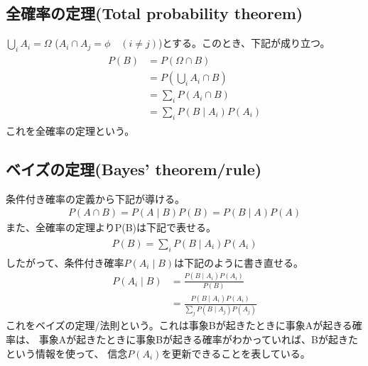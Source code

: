 \documentclass[a4j]{jarticle}
\begin{document}
\subsection{全確率の定理(Total probability theorem)}
$\bigcup^{}_{i}A_{i} = \Omega$ ($A_{i} \cap A_{j} = \phi \quad (i \neq j)$)とする。このとき、下記が成り立つ。\\
\begin{align}
    \begin{aligned}
    P(B) &= P(\Omega \cap B) \\ 
    &= P(\bigcup^{}_{i}A_{i} \cap B) \\
    &= \sum_{i}P(A_{i} \cap B) \\
    &= \sum_{i}P(B \mid A_{i})P(A_{i})
    \end{aligned}
\end{align}
これを全確率の定理という。


\subsection{ベイズの定理(Bayes' theorem/rule)}
条件付き確率の定義から下記が導ける。
\begin{align}
    P(A \cap B) = P(A \mid B)P(B) = P(B \mid A)P(A)
\end{align}
また、全確率の定理よりP(B)は下記で表せる。
\begin{align}
    \begin{aligned}
    P(B) = \sum_{i}P(B \mid A_{i})P(A_{i})
    \end{aligned}
\end{align}
したがって、条件付き確率$P(A_{i} \mid B)$は下記のように書き直せる。
\begin{align}
    P(A_{i} \mid B) &= \frac{P(B \mid A_{i})P(A_{i})}{P(B)} \\
    &= \frac{P(B \mid A_{i})P(A_{i})}{\sum_{j}P(B \mid A_{j})P(A_{j})}
\end{align}
これをベイズの定理/法則という。これは事象Bが起きたときに事象Aが起きる確率は、
事象Aが起きたときに事象Bが起きる確率がわかっていれば、Bが起きたという情報を使って、
信念$P(A_{i})$を更新できることを表している。
\end{document}
